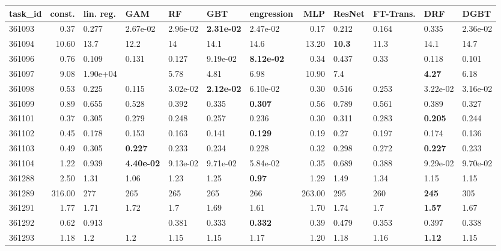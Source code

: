 \begin{table}[ht!]
\centering
\begingroup\footnotesize
\begin{tabular}{lrlllllrllll}
  \hline
\hline
task\_id & const. & lin. reg. & GAM & RF & GBT & engression & MLP & ResNet & FT-Trans. & DRF & DGBT \\ 
  \hline
361093 & 0.37 & 0.277 & 2.67e-02 & 2.96e-02 & \textbf{2.31e-02} & 2.47e-02 & 0.17 & 0.212 & 0.164 & 0.335 & 2.36e-02 \\ 
  361094 & 10.60 & 13.7 & 12.2 & 14 & 14.1 & 14.6 & 13.20 & \textbf{10.3} & 11.3 & 14.1 & 14.7 \\ 
  361096 & 0.76 & 0.109 & 0.131 & 0.127 & 9.19e-02 & \textbf{8.12e-02} & 0.34 & 0.437 & 0.33 & 0.118 & 0.101 \\ 
  361097 & 9.08 & 1.90e+04 &  & 5.78 & 4.81 & 6.98 & 10.90 & 7.4 &  & \textbf{4.27} & 6.18 \\ 
  361098 & 0.53 & 0.225 & 0.115 & 3.02e-02 & \textbf{2.12e-02} & 6.10e-02 & 0.30 & 0.516 & 0.253 & 3.22e-02 & 3.16e-02 \\ 
  361099 & 0.89 & 0.655 & 0.528 & 0.392 & 0.335 & \textbf{0.307} & 0.56 & 0.789 & 0.561 & 0.389 & 0.327 \\ 
  361101 & 0.37 & 0.305 & 0.279 & 0.248 & 0.257 & 0.236 & 0.30 & 0.311 & 0.283 & \textbf{0.205} & 0.244 \\ 
  361102 & 0.45 & 0.178 & 0.153 & 0.163 & 0.141 & \textbf{0.129} & 0.19 & 0.27 & 0.197 & 0.174 & 0.136 \\ 
  361103 & 0.49 & 0.305 & \textbf{0.227} & 0.233 & 0.234 & 0.228 & 0.32 & 0.298 & 0.272 & \textbf{0.227} & 0.233 \\ 
  361104 & 1.22 & 0.939 & \textbf{4.40e-02} & 9.13e-02 & 9.71e-02 & 5.84e-02 & 0.35 & 0.689 & 0.388 & 9.29e-02 & 9.70e-02 \\ 
  361288 & 2.50 & 1.31 & 1.06 & 1.23 & 1.25 & \textbf{0.97} & 1.29 & 1.49 & 1.34 & 1.15 & 1.15 \\ 
  361289 & 316.00 & 277 & 265 & 265 & 265 & 266 & 263.00 & 295 & 260 & \textbf{245} & 305 \\ 
  361291 & 1.77 & 1.71 & 1.72 & 1.7 & 1.69 & 1.61 & 1.70 & 1.74 & 1.7 & \textbf{1.57} & 1.67 \\ 
  361292 & 0.62 & 0.913 &  & 0.381 & 0.333 & \textbf{0.332} & 0.39 & 0.479 & 0.353 & 0.397 & 0.338 \\ 
  361293 & 1.18 & 1.2 & 1.2 & 1.15 & 1.15 & 1.17 & 1.20 & 1.18 & 1.16 & \textbf{1.12} & 1.15 \\ 

\end{tabular}
\end{table}
